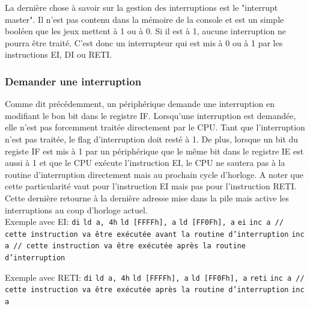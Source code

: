\documentclass[a4paper]{article}
\begin{document}
La dernière chose à savoir sur la gestion des interruptions est le "interrupt master".
Il n'est pas contenu dans la mémoire de la console et est un simple booléen que les
jeux mettent à 1 ou à 0. Si il est à 1, aucune interruption ne pourra être traité.
C'est donc un interrupteur qui est mis à 0 ou à 1 par les instructions EI, DI ou RETI.

\subsubsection{Demander une interruption}
Comme dit précédemment, un périphérique demande une interruption en modifiant le
bon bit dans le registre IF. Lorsqu'une interruption est demandée, elle n'est pas
forcemment traitée directement par le CPU. Tant que l'interruption n'est pas traitée,
le flag d'interruption doit resté à 1. De plus, lorsque un bit du registe IF est mis
à 1 par un périphérique que le même bit dans le registre IE est aussi à 1 et que
le CPU exécute l'instruction EI, le CPU ne sautera pas à la routine d'interruption
directement mais au prochain cycle d'horloge. A noter que cette particularité vaut 
pour l'instruction EI mais pas pour l'instruction RETI. Cette dernière retourne à
la dernière adresse mise dans la pile mais active les interruptions au coup d'horloge
actuel. \\

Exemple avec EI: \newline
\texttt{di} \newline
\texttt{ld a, 4h} \newline
\texttt{ld [FFFFh], a} \newline
\texttt{ld [FF0Fh], a} \newline
\texttt{ei} \newline
\texttt{inc a // cette instruction va être exécutée avant la routine d'interruption} \newline
\texttt{inc a // cette instruction va être exécutée après la routine d'interruption} \newline

Exemple avec RETI: \newline
\texttt{di} \newline
\texttt{ld a, 4h} \newline
\texttt{ld [FFFFh], a} \newline
\texttt{ld [FF0Fh], a} \newline
\texttt{reti} \newline
\texttt{inc a // cette instruction va être exécutée après la routine d'interruption} \newline
\texttt{inc a} \newline
\end{document}
